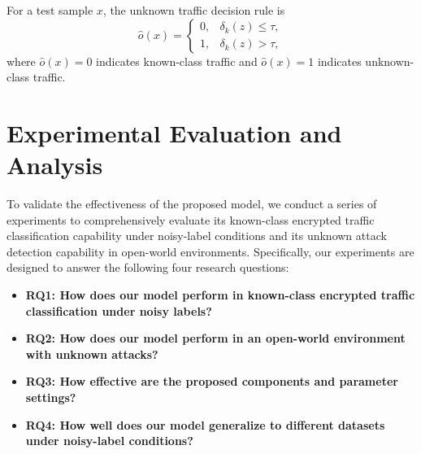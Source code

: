 \documentclass{SCIS2026}
\begin{document}
For a test sample $x$, the unknown traffic decision rule is
\begin{equation}
	\hat{o}(x)
	=
	\begin{cases}
		0, & \delta_k(z)\leq \tau,\\
		1, & \delta_k(z)>\tau,
	\end{cases}
	\label{eq:unknown_decision}
\end{equation}
where $\hat{o}(x)=0$ indicates known-class traffic and $\hat{o}(x)=1$ indicates unknown-class traffic.










\section{Experimental Evaluation and Analysis}\label{Experiment}



To validate the effectiveness of the proposed model, we conduct a series of experiments to comprehensively evaluate its known-class encrypted traffic classification capability under noisy-label conditions and its unknown attack detection capability in open-world environments. Specifically, our experiments are designed to answer the following four research questions:


\begin{itemize}
	\item \textbf{RQ1: How does our model perform in known-class encrypted traffic classification under noisy labels?}
	\item \textbf{RQ2: How does our model perform in an open-world environment with unknown attacks?}
	\item \textbf{RQ3: How effective are the proposed components and parameter settings?}
	\item \textbf{RQ4: How well does our model generalize to different datasets under noisy-label conditions?}
\end{itemize}
\end{document}

